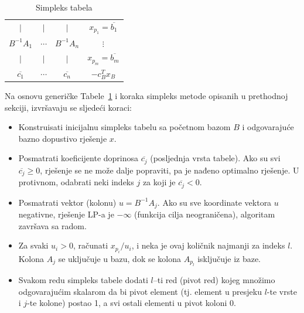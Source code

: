 \documentclass[b5paper, utf8, 11pt, colorlinks]{book}
\theoremstyle{definition}
\begin{document}
\begin{table}[!ht]
	\centering
	\begin{tabular}{c c c | c} \\ \hline
		$\mid$          &       $\mid$ &  $\mid$             &    $x_{p_1} = \overline{b_1}$         \\
		$B^{-1}A_1$       &    $\cdots$    &  $B^{-1}A_n$      &    $\vdots$          \\
		$\mid$          &       $\mid$ &  $\mid$             &   $ x_{p_m} = \overline{b_m}$         \\ \hline
		$\overline{c_1}$  &    $\cdots$    & $\overline{c_n}$  &  $-c^T_B x_B$         \\ \hline
	\end{tabular}
	\caption{Simpleks tabela}
	\label{tab:simplex_tabelau}
\end{table}

Na osnovu generičke Tabele~\ref{tab:simplex_tabelau} i koraka simpleks metode opisanih u prethodnoj sekciji, izvršavaju se sljedeći koraci:
 \begin{itemize}
	\item Konstruisati inicijalnu simpleks tabelu sa početnom bazom $B$ i  odgovarajuće bazno dopustivo rješenje $x$.
	 \item Posmatrati koeficijente doprinosa $\overline{c_j}$ (posljednja vrsta tabele). Ako su svi $\overline{c_j} \geq 0$, rješenje se ne može dalje popraviti, pa je nađeno optimalno rješenje. U protivnom, odabrati neki indeks $j$ za koji je $\overline{c_j}<0$.
	 \item Posmatrati vektor (kolonu) $u = B^{-1}A_j$. Ako su sve koordinate vektora $u$ negativne, rješenje LP-a je $-\infty$ (funkcija cilja neograničena), algoritam završava sa radom.
	 \item Za svaki $u_i > 0$, računati $x_{p_i}/u_i$, i neka je   ovaj količnik najmanji za indeks $l$. Kolona $A_{j}$ se uključuje u bazu, dok se kolona $A_{p_l}$ isključuje iz baze. 
	 \item Svakom redu simpleks tabele dodati $l$--ti red (pivot red) kojeg množimo odgovarajućim
	 skalarom da bi pivot element (tj. element u presjeku $l$-te vrste i $j$-te kolone) postao 1, a svi ostali elementi u pivot koloni 0.
 \end{itemize}
\end{document}

